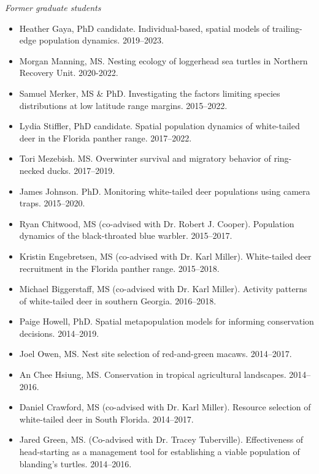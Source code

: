 \documentclass[12pt]{article}
\begin{document}
{\it Former graduate students}
\begin{itemize}
  \item Heather Gaya, PhD candidate. Individual-based, spatial models
    of trailing-edge population dynamics. 2019--2023. 
  \item Morgan Manning, MS. Nesting ecology of loggerhead
    sea turtles in Northern Recovery Unit. 2020-2022. 
  \item Samuel Merker, MS \& PhD. Investigating the factors
    limiting species distributions at low latitude range
    margins. 2015--2022. 
  \item Lydia Stiffler, PhD candidate. Spatial population dynamics of
    white-tailed deer in the Florida panther range. 2017--2022.
  \item Tori Mezebish. MS. Overwinter survival and migratory
    behavior of ring-necked ducks. 2017--2019.
   \item James Johnson. PhD. Monitoring white-tailed deer
     populations using camera traps. 2015--2020. 
  \item Ryan Chitwood, MS (co-advised with Dr. Robert
    J. Cooper). Population dynamics of the black-throated blue
    warbler. 2015--2017. 
  \item Kristin Engebretsen, MS (co-advised with Dr. Karl
    Miller). White-tailed deer recruitment in the Florida panther
    range. 2015--2018. 
  \item Michael Biggerstaff, MS (co-advised with Dr. Karl
    Miller). Activity patterns of white-tailed deer in southern
    Georgia. 2016--2018. 
  \item Paige Howell, PhD. Spatial metapopulation models for 
    informing conservation decisions. 2014--2019. 
  \item Joel Owen, MS. Nest site selection of red-and-green
    macaws. 2014--2017. 
  \item An Chee Hsiung, MS. Conservation in tropical agricultural
    landscapes. 2014--2016. 
  \item Daniel Crawford, MS (co-advised with Dr. Karl
    Miller). Resource selection of white-tailed deer in South
    Florida. 2014--2017. 
  \item Jared Green, MS. (Co-advised with Dr. Tracey
    Tuberville). Effectiveness of head-starting as a management tool
    for establishing a viable population of blanding's
    turtles. 2014--2016. 
\end{itemize}

\end{document}

